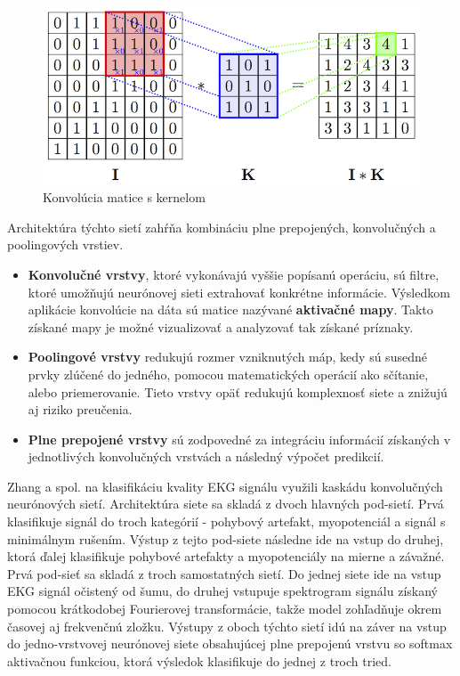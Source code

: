 \begin{figure}[H]
    \centering
    \includegraphics[scale=0.3]{img/convolution.png}
    \caption{Konvolúcia matice s kernelom\cite{mohamed2017}}
    \label{fig:convolution}
\end{figure}

Architektúra týchto sietí zahŕňa kombináciu plne prepojených, konvolučných a poolingových vrstiev.
\begin{itemize}
    \item \textbf{Konvolučné vrstvy}, ktoré vykonávajú vyššie popísanú operáciu, sú filtre, ktoré umožňujú neurónovej sieti extrahovať konkrétne informácie. Výsledkom aplikácie konvolúcie na dáta sú matice nazývané \textbf{aktivačné mapy}. Takto získané mapy je možné vizualizovať a analyzovať tak získané príznaky. 
    \item \textbf{Poolingové vrstvy}  redukujú rozmer vzniknutých máp, kedy sú susedné prvky zlúčené do jedného, pomocou matematických operácií ako sčítanie, alebo priemerovanie. Tieto vrstvy opäť redukujú komplexnosť siete a znižujú aj riziko preučenia.
    \item \textbf{Plne prepojené vrstvy} sú zodpovedné za integráciu informácií získaných v jednotlivých konvolučných vrstvách a následný výpočet predikcií.\cite{Sakib2019}\cite{Aloysius2017}\cite{Albawi2017}
\end{itemize}

Zhang a spol.\cite{Zhang2019} na klasifikáciu kvality EKG signálu využili kaskádu konvolučných neurónových sietí. Architektúra siete sa skladá z dvoch hlavných pod-sietí. Prvá klasifikuje signál do troch kategórií - pohybový artefakt, myopotenciál a signál s minimálnym rušením. Výstup z tejto pod-siete následne ide na vstup do druhej, ktorá ďalej klasifikuje pohybové artefakty a myopotenciály na mierne a závažné. Prvá pod-sieť sa skladá z troch samostatných sietí. Do jednej siete ide na vstup EKG signál očistený od šumu, do druhej vstupuje spektrogram signálu získaný pomocou krátkodobej Fourierovej transformácie, takže model zohľadňuje okrem časovej aj frekvenčnú zložku. Výstupy z oboch týchto sietí idú na záver na vstup do jedno-vrstvovej neurónovej siete obsahujúcej plne prepojenú vrstvu so softmax aktivačnou funkciou, ktorá výsledok klasifikuje do jednej z troch tried.

